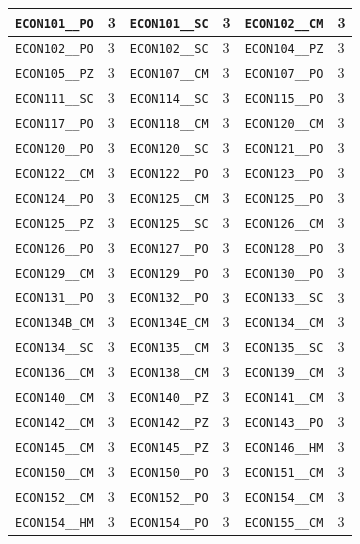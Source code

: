 \begin{longtable}{|l|l||l|l||l|l|}
    \verb|ECON101__PO| & 3 & \verb|ECON101__SC| & 3 & \verb|ECON102__CM| & 3\\\hline
    \verb|ECON102__PO| & 3 & \verb|ECON102__SC| & 3 & \verb|ECON104__PZ| & 3\\\hline
    \verb|ECON105__PZ| & 3 & \verb|ECON107__CM| & 3 & \verb|ECON107__PO| & 3\\\hline
    \verb|ECON111__SC| & 3 & \verb|ECON114__SC| & 3 & \verb|ECON115__PO| & 3\\\hline
    \verb|ECON117__PO| & 3 & \verb|ECON118__CM| & 3 & \verb|ECON120__CM| & 3\\\hline
    \verb|ECON120__PO| & 3 & \verb|ECON120__SC| & 3 & \verb|ECON121__PO| & 3\\\hline
    \verb|ECON122__CM| & 3 & \verb|ECON122__PO| & 3 & \verb|ECON123__PO| & 3\\\hline
    \verb|ECON124__PO| & 3 & \verb|ECON125__CM| & 3 & \verb|ECON125__PO| & 3\\\hline
    \verb|ECON125__PZ| & 3 & \verb|ECON125__SC| & 3 & \verb|ECON126__CM| & 3\\\hline
    \verb|ECON126__PO| & 3 & \verb|ECON127__PO| & 3 & \verb|ECON128__PO| & 3\\\hline
    \verb|ECON129__CM| & 3 & \verb|ECON129__PO| & 3 & \verb|ECON130__PO| & 3\\\hline
    \verb|ECON131__PO| & 3 & \verb|ECON132__PO| & 3 & \verb|ECON133__SC| & 3\\\hline
    \verb|ECON134B_CM| & 3 & \verb|ECON134E_CM| & 3 & \verb|ECON134__CM| & 3\\\hline
    \verb|ECON134__SC| & 3 & \verb|ECON135__CM| & 3 & \verb|ECON135__SC| & 3\\\hline
    \verb|ECON136__CM| & 3 & \verb|ECON138__CM| & 3 & \verb|ECON139__CM| & 3\\\hline
    \verb|ECON140__CM| & 3 & \verb|ECON140__PZ| & 3 & \verb|ECON141__CM| & 3\\\hline
    \verb|ECON142__CM| & 3 & \verb|ECON142__PZ| & 3 & \verb|ECON143__PO| & 3\\\hline
    \verb|ECON145__CM| & 3 & \verb|ECON145__PZ| & 3 & \verb|ECON146__HM| & 3\\\hline
    \verb|ECON150__CM| & 3 & \verb|ECON150__PO| & 3 & \verb|ECON151__CM| & 3\\\hline
    \verb|ECON152__CM| & 3 & \verb|ECON152__PO| & 3 & \verb|ECON154__CM| & 3\\\hline
    \verb|ECON154__HM| & 3 & \verb|ECON154__PO| & 3 & \verb|ECON155__CM| & 3\\\hline

\end{longtable}
